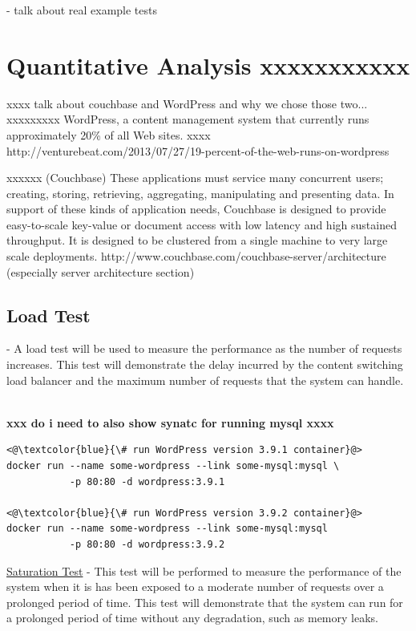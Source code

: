 \documentclass[a4paper,11pt,twoside]{report}
\begin{document}
- talk about real example tests

\section{Quantitative Analysis xxxxxxxxxxx}\label{Quantitative_Analysis}
xxxx talk about couchbase and WordPress and why we chose those two...\bigskip
xxxxxxxxx WordPress, a content management system that currently runs approximately 20\% of all Web sites.
xxxx   http://venturebeat.com/2013/07/27/19-percent-of-the-web-runs-on-wordpress\bigskip  

\noindent
xxxxxx (Couchbase) These applications must service many concurrent users; creating, storing, retrieving, aggregating, manipulating and presenting data. In support of these kinds of application needs, Couchbase is designed to provide easy-to-scale key-value or document access with low latency and high sustained throughput. It is designed to be clustered from a single machine to very large scale deployments. http://www.couchbase.com/couchbase-server/architecture (especially server architecture section) \bigskip


\subsection{Load Test}\label{load} - A load test will be used to measure the performance as the number of requests increases. This test will demonstrate the delay incurred by the content switching load balancer and the maximum number of requests that the system can handle.

\noindent\\
\textbf{xxx do i need to also show synatc for running mysql xxxx}
\begin{lstlisting}[language=terminal]
<@\textcolor{blue}{\# run WordPress version 3.9.1 container}@>
docker run --name some-wordpress --link some-mysql:mysql \
           -p 80:80 -d wordpress:3.9.1

<@\textcolor{blue}{\# run WordPress version 3.9.2 container}@>
docker run --name some-wordpress --link some-mysql:mysql 
           -p 80:80 -d wordpress:3.9.2
\end{lstlisting}




\noindent
\underline{Saturation Test} - This test will be performed to measure the performance of the system when it is has been exposed to a moderate number of requests over a prolonged period of time. This test will demonstrate that the system can run for a prolonged period of time without any degradation, such as memory leaks.
\end{document}

